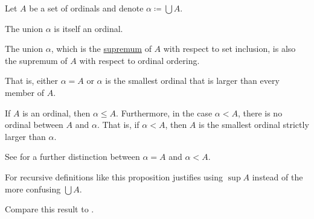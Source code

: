 \begin{proposition}\label{thm:union_of_set_of_ordinals}
  Let \( A \) be a set of ordinals and denote \( \alpha \coloneqq \bigcup A \).

  \begin{thmenum}
     The union \( \alpha \) is itself an ordinal.

     The union \( \alpha \), which is the \hyperref[def:extremal_points/supremum_and_infimum]{supremum} of \( A \) with respect to set inclusion, is also the supremum of \( A \) with respect to ordinal ordering.

    That is, either \( \alpha = A \) or \( \alpha \) is the smallest ordinal that is larger than every member of \( A \).

     If \( A \) is an ordinal, then \( \alpha \leq A \). Furthermore, in the case \( \alpha < A \), there is no ordinal between \( A \) and \( \alpha \). That is, if \( \alpha < A \), then \( A \) is the smallest ordinal strictly larger than \( \alpha \).

    See  for a further distinction between \( \alpha = A \) and \( \alpha < A \).
  \end{thmenum}

  For recursive definitions like  this proposition justifies using \( \sup A \) instead of the more confusing \( \bigcup A \).

  Compare this result to .
\end{proposition}
